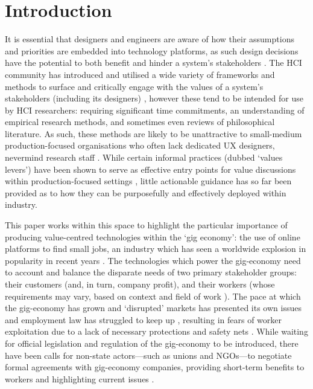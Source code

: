 \section{Introduction}
It is essential that designers and engineers are aware of how their assumptions and priorities are embedded into technology platforms, as such design decisions have the potential to both benefit and hinder a system's stakeholders \cite{winner1980}. The HCI community has introduced and utilised a wide variety of frameworks and methods to surface and critically engage with the values of a system's stakeholders (including its designers) \cite{friedman2006, flanagan2014, Alshehri2020, shilton2018}, however these tend to be intended for use by HCI researchers: requiring significant time commitments, an understanding of empirical research methods, and sometimes even reviews of philosophical literature. As such, these methods are likely to be unattractive to small-medium production-focused organisations who often lack dedicated UX designers, nevermind research staff \cite{Shilton2013, Ardito2014}. While certain informal practices (dubbed `values levers') have been shown to serve as effective entry points for value discussions within production-focused settings \cite{Shilton2013, shilton2018, shilton2019}, little actionable guidance has so far been provided as to how they can be purposefully and effectively deployed within industry.

This paper works within this space to highlight the particular importance of producing value-centred technologies within the `gig economy': the use of online platforms to find small jobs, an industry which has seen a worldwide explosion in popularity in recent years \cite{Taylor2017, islam2019, Wood2019}. The technologies which power the gig-economy need to account and balance the disparate needs of two primary stakeholder groups: their customers (and, in turn, company profit), and their workers (whose requirements may vary, based on context and field of work \cite{carlos2021}). The pace at which the gig-economy has grown and `disrupted' markets has presented its own issues and employment law has struggled to keep up \cite{Minter2017}, resulting in fears of worker exploitation due to a lack of necessary protections and safety nets \cite{Balaram2017}. While waiting for official legislation and regulation of the gig-economy to be introduced, there have been calls for non-state actors---such as unions and NGOs---to negotiate formal agreements with gig-economy companies, providing short-term benefits to workers and highlighting current issues \cite{Minter2017}. 

